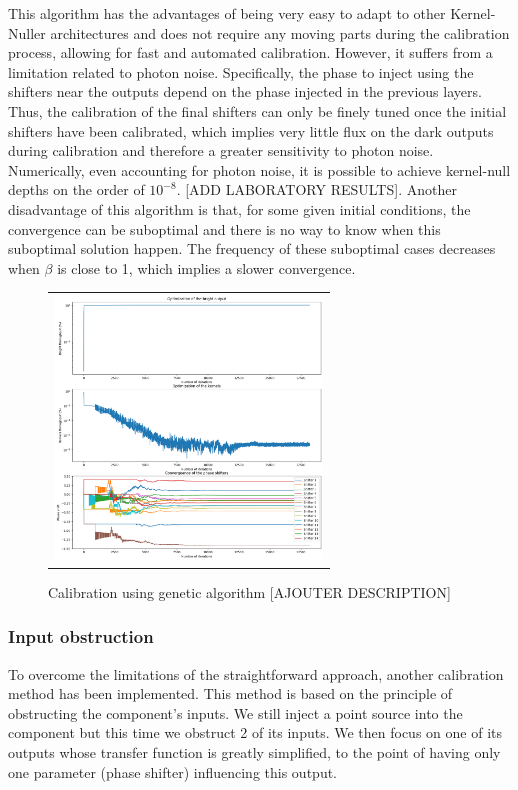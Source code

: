 \documentclass{aa}
\begin{document}
            This algorithm has the advantages of being very easy to adapt to other Kernel-Nuller architectures and does not require any moving parts during the calibration process, allowing for fast and automated calibration. However, it suffers from a limitation related to photon noise. Specifically, the phase to inject using the shifters near the outputs depend on the phase injected in the previous layers. Thus, the calibration of the final shifters can only be finely tuned once the initial shifters have been calibrated, which implies very little flux on the dark outputs during calibration and therefore a greater sensitivity to photon noise. Numerically, even accounting for photon noise, it is possible to achieve kernel-null depths on the order of $10^{-8}$. [ADD LABORATORY RESULTS]. Another disadvantage of this algorithm is that, for some given initial conditions, the convergence can be suboptimal and there is no way to know when this suboptimal solution happen. The frequency of these suboptimal cases decreases when $\beta$ is close to 1, which implies a slower convergence.

            \begin{figure}[H]
                \begin{center}
                \begin{tabular}{c}
                \includegraphics[height=7cm]{img/calibration_genetic.png}
                \end{tabular}
                \end{center}
                \caption[calibration_genetic] 
                { \label{fig:calibration_genetic} 
                Calibration using genetic algorithm [AJOUTER DESCRIPTION]}
            \end{figure}

        \subsubsection{Input obstruction}
            To overcome the limitations of the straightforward approach, another calibration method has been implemented. This method is based on the principle of obstructing the component's inputs. We still inject a point source into the component but this time we obstruct 2 of its inputs. We then focus on one of its outputs whose transfer function is greatly simplified, to the point of having only one parameter (phase shifter) influencing this output.
\end{document}
